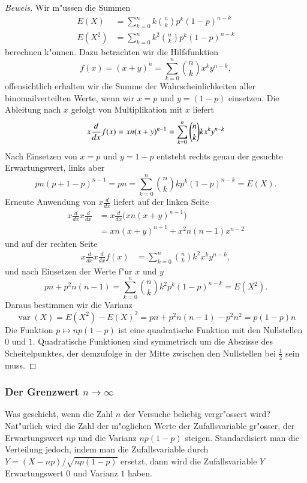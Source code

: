 \begin{proof}[Beweis] Wir m"ussen die Summen
\begin{align*}
E(X)&=\sum_{k=0}^nk\binom{n}{k}p^k(1-p)^{n-k}\\
E(X^2)&=\sum_{k=0}^nk^2\binom{n}{k}p^k(1-p)^{n-k}
\end{align*}
berechnen k"onnen.
Dazu betrachten wir die Hilfsfunktion
\[
f(x)=(x+y)^n=\sum_{k=0}^n\binom{n}{k}x^ky^{n-k},
\]
offensichtlich erhalten wir die Summe der Wahrscheinlichkeiten aller
binomailverteilten Werte, wenn
wir $x=p$ und $y=(1-p)$ einsetzen.
Die Ableitung nach $x$ gefolgt von Multiplikation mit $x$ liefert
\[
 x\frac{d}{dx}f(x)
=xn(x+y)^{n-1}\\
=\sum_{k=0}^n\binom{n}{k}kx^ky^{n-k}
\]
Nach Einsetzen von $x=p$ und $y=1-p$ entsteht rechts genau
der gesuchte Erwartungswert, links aber
\[
pn(p+1-p)^{n-1}=pn=\sum_{k=0}^n\binom{n}{k}kp^k(1-p)^{n-k}=E(X).
\]
Erneute Anwendung von $x\frac{d}{dx}$ liefert auf der linken Seite
\begin{align*}
x\frac{d}{dx}x\frac{d}{dx}
&=
x\frac{d}{dx}\bigl(xn(x+y)^{n-1}\bigr)
\\
&=
xn(x+y)^{n-1}+x^2 n(n-1)x^{n-2}
\end{align*}
und auf der rechten Seite
\begin{align*}
x\frac{d}{dx} x\frac{d}{dx} f(x)
&=\sum_{k=0}^n\binom{n}{k}k^2x^ky^{n-k},
\end{align*}
und nach Einsetzen der Werte f"ur $x$ und $y$
\[
pn+p^2n(n-1)=\sum_{k=0}^n\binom{n}{k}k^2p^k(1-p)^{n-k}=E(X^2).
\]
Daraus bestimmen wir die Varianz
\[
\operatorname{var}(X)=E(X^2)-E(X)^2=pn+p^2n(n-1)-p^2n^2=p(1-p)n
\]
Die Funktion $p\mapsto np(1-p)$ ist eine quadratische Funktion mit den
Nullstellen $0$ und $1$.
Quadratische Funktionen sind symmetrisch um
die Abszisse des Scheitelpunktes, der demzufolge in der Mitte zwischen
den Nullstellen bei $\frac12$ sein muss.
\end{proof}

\subsubsection{Der Grenzwert \texorpdfstring{$n\to\infty$}{n gegen unendlich}}
Was geschieht, wenn die Zahl $n$ der Versuche beliebig vergr"ossert wird?
Nat"urlich wird die Zahl der m"oglichen Werte der Zufallsvariable
gr"osser, der Erwartungswert $np$ und die Varianz $np(1-p)$ steigen.
Standardisiert man die Verteilung jedoch, indem man die Zufallsvariable
durch $Y=(X-np)/\sqrt{np(1-p)}$ ersetzt, dann wird die Zufallsvariable $Y$
Erwartungswert $0$ und Varianz $1$ haben. 

